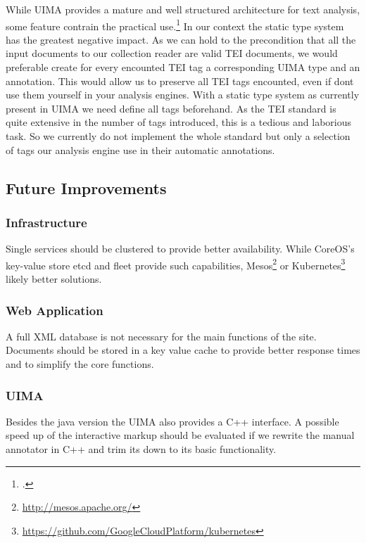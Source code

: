 \documentclass[12pt, draft]{article}
\begin{document}
While UIMA provides a mature and well structured architecture for text analysis,
some feature contrain the practical use.\footcite{Goetz:2014}
In our context the static type system has the greatest negative impact.
As we can hold to the precondition that all the input documents to our
collection reader are valid TEI documents, we would preferable
create for every encounted TEI tag a corresponding UIMA type and an annotation. 
This would allow us to preserve all TEI tags encounted, even if dont use them
yourself in your analysis engines. With a static type system
as currently present in UIMA we need define all tags beforehand.
As the TEI standard is quite extensive in the number of tags introduced,
this is a tedious and laborious task.
So we currently do not implement the whole standard but only a selection of tags
our analysis engine use in their automatic annotations.

\subsection{Future Improvements}

\subsubsection{Infrastructure}
Single services should be clustered to provide better availability. While CoreOS's key-value store etcd
and fleet provide such capabilities, Mesos\footnote{\url{http://mesos.apache.org/}}
 or Kubernetes\footnote{\url{https://github.com/GoogleCloudPlatform/kubernetes}}
 likely better solutions.

\subsubsection{Web Application}

A full XML database is not necessary for the main functions of the site.
Documents should be stored in a key value cache to provide
better response times and to simplify the core functions.

\subsubsection{UIMA}
Besides the java version the UIMA also provides a C++ interface.
A possible speed up of the interactive markup should be evaluated
if we rewrite the manual annotator in C++ and trim its down to its basic
functionality.
\end{document}
